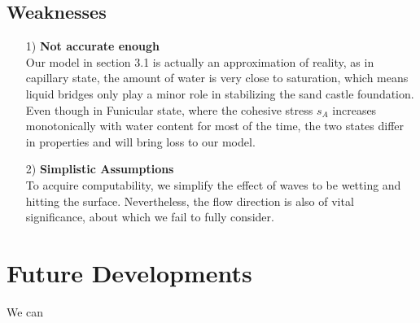 \documentclass[12pt]{article}
\begin{document}
\subsection{Weaknesses}
\begin{itemize}
    \item [1)]
          \textbf{Not accurate enough}\\
          Our model in section 3.1 is actually an approximation of reality, as in capillary state, the amount of water is very close to saturation, which means liquid bridges only play a minor role in stabilizing the sand castle foundation. Even though in Funicular state, where the cohesive stress $s_A$ increases monotonically with water content for most of the time, the two states differ in properties and will bring loss to our model.
    \item [2)]
          \textbf{Simplistic Assumptions}\\
          To acquire computability, we simplify the effect of waves to be wetting and hitting the surface. Nevertheless, the flow direction is also of vital significance, about which we fail to fully consider.

\end{itemize}

\section{Future Developments}
\par
We can






\newpage
\begin{appendix}
    \listoffigures
    \listoftables
    \listoflistings
    \printbibliography
\end{appendix}
\end{document}

